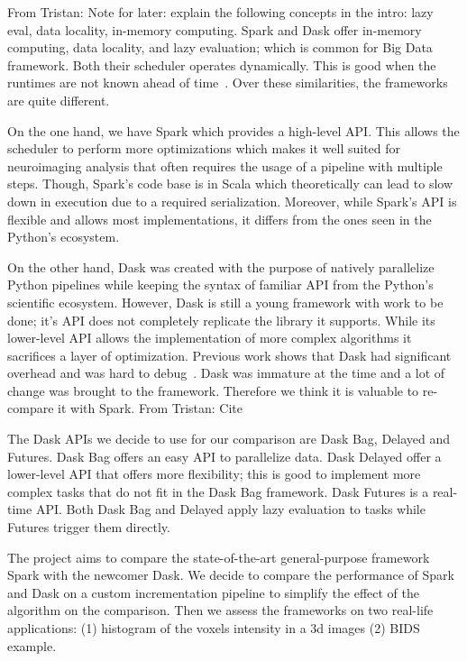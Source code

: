 \documentclass[conference]{IEEEtran}
\newcommand{\TG}[1]{\color{cyan}From Tristan: #1 \color{black}}
\begin{document}
\TG{Note for later: explain the following concepts in the intro: lazy eval, data locality, in-memory computing.}
Spark and Dask offer in-memory computing, data locality, and lazy evaluation; which
is common for Big Data framework. Both their scheduler operates dynamically. This is
good when the runtimes are not known ahead of time~\cite{Dask:15}. Over these
similarities, the frameworks are quite different.

On the one hand, we have Spark which provides a high-level API. This allows the
scheduler to perform more optimizations which makes it well suited for neuroimaging
analysis that often requires the usage of a pipeline with multiple steps. Though,
Spark's code base is in Scala which theoretically can lead to slow down in execution
due to a required serialization. Moreover, while Spark's API is flexible and allows
most implementations, it differs from the ones seen in the Python's ecosystem.

On the other hand, Dask was created with the purpose of natively parallelize Python
pipelines while keeping the syntax of familiar API from the Python's scientific
ecosystem. However, Dask is still a young framework with work to be done; it's API
does not completely replicate the library it supports. While its lower-level API
allows the implementation of more complex algorithms it sacrifices a layer of
optimization.
Previous work shows that Dask had significant overhead and was
hard to debug~\cite{Mehta:17}.
Dask was immature at the time and a lot of change was brought to the framework.
Therefore we think it is valuable to re-compare it with Spark.
\TG{Cite~\cite{hayot2019performance}}

The Dask APIs we decide to use for our comparison are Dask Bag, Delayed and Futures.
Dask Bag offers an easy API to parallelize data. Dask Delayed offer a lower-level API
that offers more flexibility; this is good to implement more complex tasks that do
not fit in the Dask Bag framework. Dask Futures is a real-time API. Both Dask Bag and
Delayed apply lazy evaluation to tasks while Futures trigger them directly.

The project aims to compare the state-of-the-art general-purpose framework Spark with
the newcomer Dask. We decide to compare the performance of Spark and Dask on a custom
incrementation pipeline to simplify the effect of the algorithm on the comparison.
Then we assess the frameworks on two real-life applications: (1) histogram of the
voxels intensity in a 3d images (2) BIDS example.
\end{document}
